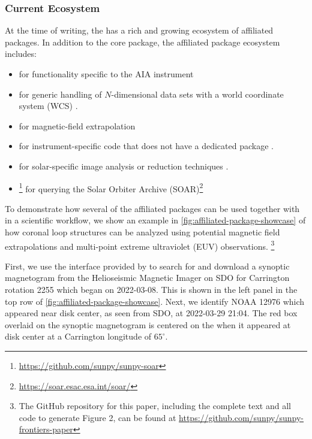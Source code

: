 \subsubsection{Current Ecosystem}
\label{sssec:current-ecosystem}

At the time of writing, the \sunpyproj has a rich and growing ecosystem of affiliated packages.
In addition to the \sunpypkg core package, the affiliated package ecosystem includes:

\begin{itemize}
    \item \aiapypkg for functionality specific to the AIA instrument \citep{barnes_aiapy_2020}
    \item {} for generic handling of $N$-dimensional data sets with a world coordinate system (WCS) \citep{danryanirish_2021_5715161}.
    \item {} for magnetic-field extrapolation \citep{stansby_pfsspy_2020}
    \item {} for instrument-specific code that does not have a dedicated package \citep{danryanirish_2022_7190661}.
    \item {} for solar-specific image analysis or reduction techniques \citep{nabil_freij_2022_6578722}.
    \item {}\footnote{\url{https://github.com/sunpy/sunpy-soar}} for querying the Solar Orbiter Archive (SOAR)\footnote{\url{https://soar.esac.esa.int/soar/}}
\end{itemize}

To demonstrate how several of the affiliated packages can be used together with \sunpypkg in a scientific workflow, we show an example in \autoref{fig:affiliated-package-showcase} of how coronal loop structures can be analyzed using potential magnetic field extrapolations and multi-point extreme ultraviolet (EUV) observations.
\footnote{The GitHub repository for this paper, including the complete text and all code to generate Figure 2, can be found at \url{https://github.com/sunpy/sunpy-frontiers-paper}}

First, we use the \Fido interface provided by \sunpypkg to search for and download a synoptic magnetogram from the Helioseismic Magnetic Imager \citep[HMI,][]{scherrer_helioseismic_2012} on SDO for Carrington rotation 2255 which began on 2022-03-08.
This is shown in the left panel in the top row of \autoref{fig:affiliated-package-showcase}.
Next, we identify \AR NOAA 12976 which appeared near disk center, as seen from SDO, at 2022-03-29 21:04.
The red box overlaid on the synoptic magnetogram is centered on the \AR when it appeared at disk center at a Carrington longitude of $65^\circ$.

